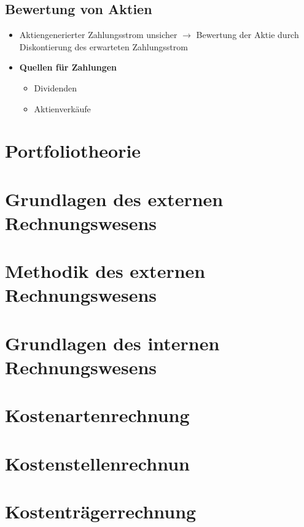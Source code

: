 \subsection{Bewertung von Aktien}
\begin{itemize}
	\item Aktiengenerierter Zahlungsstrom unsicher $\rightarrow$ Bewertung der Aktie durch Diskontierung des erwarteten Zahlungsstrom
	\item \textbf{Quellen für Zahlungen}
	\begin{itemize}
		\item Dividenden
		\item Aktienverkäufe
	\end{itemize}
\end{itemize}



\section{Portfoliotheorie}



\section{Grundlagen des externen Rechnungswesens}



\section{Methodik des externen Rechnungswesens}



\section{Grundlagen des internen Rechnungswesens}



\section{Kostenartenrechnung}



\section{Kostenstellenrechnun}



\section{Kostenträgerrechnung}



